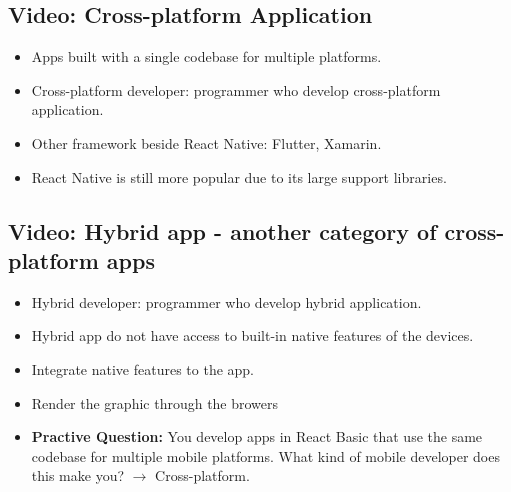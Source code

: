 \subsection{Video: Cross-platform Application}
\begin{itemize}
    \item Apps built with a single codebase for multiple platforms.
    \item Cross-platform developer: programmer who develop cross-platform application.
    \item Other framework beside React Native: Flutter, Xamarin.
    \item React Native is still more popular due to its large support libraries.
\end{itemize}

\subsection{Video: Hybrid app - another category of cross-platform apps}
\begin{itemize}
    \item Hybrid developer: programmer who develop hybrid application.
    \item Hybrid app do not have access to built-in native  features of the devices.
    \item Integrate native features to the app.
    \item Render the graphic through the browers

    \item \textbf{Practive Question:} You develop apps in React Basic that use the same codebase for multiple mobile platforms. What kind of mobile developer does this make you?   
    $\rightarrow$ Cross-platform.
\end{itemize}

